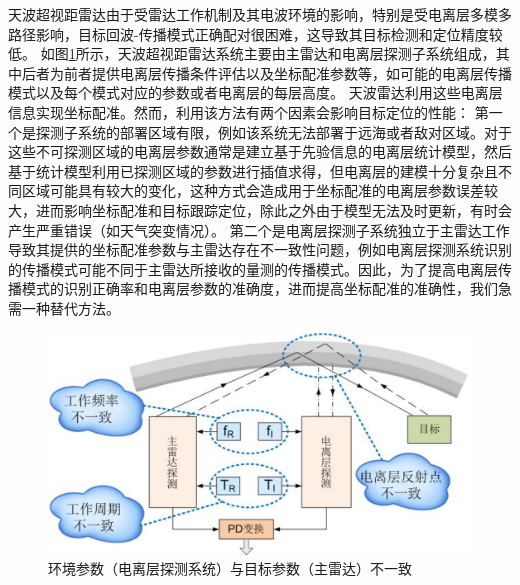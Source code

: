 天波超视距雷达由于受雷达工作机制及其电波环境的影响，特别是受电离层多模多路径影响，目标回波-传播模式正确配对很困难，这导致其目标检测和定位精度较低。
如图\ref{fig:pdproblem}所示，天波超视距雷达系统主要由主雷达和电离层探测子系统组成，其中后者为前者提供电离层传播条件评估以及坐标配准参数等，如可能的电离层传播模式以及每个模式对应的参数或者电离层的每层高度\cite{wheadon1994ionospheric}。
天波雷达利用这些电离层信息实现坐标配准。然而，利用该方法有两个因素会影响目标定位的性能：
第一个是探测子系统的部署区域有限，例如该系统无法部署于远海或者敌对区域。对于这些不可探测区域的电离层参数通常是建立基于先验信息的电离层统计模型，然后基于统计模型利用已探测区域的参数进行插值求得，但电离层的建模十分复杂且不同区域可能具有较大的变化，这种方式会造成用于坐标配准的电离层参数误差较大，进而影响坐标配准和目标跟踪定位，除此之外由于模型无法及时更新，有时会产生严重错误（如天气突变情况）。
第二个是电离层探测子系统独立于主雷达工作导致其提供的坐标配准参数与主雷达存在不一致性问题，例如电离层探测系统识别的传播模式可能不同于主雷达所接收的量测的传播模式。因此，为了提高电离层传播模式的识别正确率和电离层参数的准确度，进而提高坐标配准的准确性，我们急需一种替代方法。
\begin{figure}[htb]
	\centering
	\includegraphics[width=\textwidth]{figures/introduction/pdproblem}
	\caption{环境参数（电离层探测系统）与目标参数（主雷达）不一致}
	\label{fig:pdproblem}
\end{figure}

